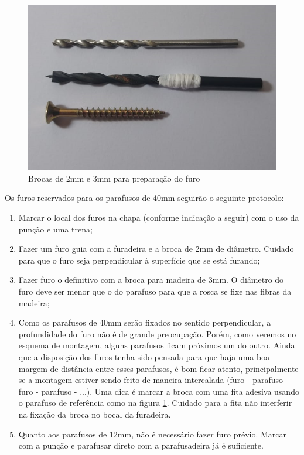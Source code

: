   \begin{figure} [H]
    \centering
    \includegraphics[width=.7\textwidth]{Figuras/montagemMaletasEstrutura/brocas.png}
    \caption{Brocas de 2mm e 3mm para preparação do furo}
    \label{fig:brocas1}
\end{figure}
  
\par Os furos reservados para os parafusos de 40mm seguirão o seguinte protocolo:

\begin{enumerate}
    \item Marcar o local dos furos na chapa (conforme indicação a seguir) com o uso da punção e uma trena;
    \item Fazer um furo guia com a furadeira e a broca de 2mm de diâmetro. Cuidado para que o furo seja perpendicular à superfície que se está furando;
    \item Fazer furo o definitivo com a broca para madeira de 3mm. O diâmetro do furo deve ser menor que o do parafuso para que a rosca se fixe nas fibras da madeira;
    \item Como os parafusos de 40mm serão fixados no sentido perpendicular, a profundidade do furo não é de grande preocupação. Porém, como veremos no esquema de montagem, alguns parafusos ficam próximos um do outro. Ainda que a disposição dos furos tenha sido pensada para que haja uma boa margem de distância entre esses parafusos, é bom ficar atento, principalmente se a montagem estiver sendo feito de maneira intercalada (furo - parafuso - furo - parafuso - ...). Uma dica é marcar a broca com uma fita adesiva usando o parafuso de referência como na figura \ref{fig:brocas1}. Cuidado para a fita não interferir na fixação da broca no bocal da furadeira.
    \item Quanto aos parafusos de 12mm, não é necessário fazer furo prévio. Marcar com a punção e parafusar direto com a parafusadeira já é suficiente.
\end{enumerate}

